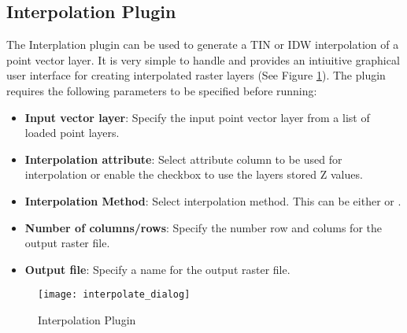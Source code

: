 
\subsection{Interpolation Plugin}


The Interplation plugin can be used to generate a TIN or IDW interpolation of a 
point vector layer. It is very simple to handle and provides an intiuitive graphical 
user interface for creating interpolated raster layers (See Figure \ref{fig:interpolation_dialog}).
The plugin requires the following parameters to be specified before running:

\begin{itemize}
\item \textbf{Input vector layer}: Specify the input point vector layer from a list of loaded point layers.
\item \textbf{Interpolation attribute}: Select attribute column to be used for interpolation or 
enable the  checkbox to use the layers stored Z values.
\item \textbf{Interpolation Method}: Select interpolation method. This can be either  or .
\item \textbf{Number of columns/rows}: Specify the number row and colums for the output raster file.
\item \textbf{Output file}: Specify a name for the output raster file.
\end{itemize}

\begin{figure}[ht]
   \begin{center}
   \caption{Interpolation Plugin \nixcaption}\label{fig:interpolation_dialog}\smallskip
   \texttt{[image: interpolate\_dialog]}
\end{center}  
\end{figure}

\label{interpolation_usage}

